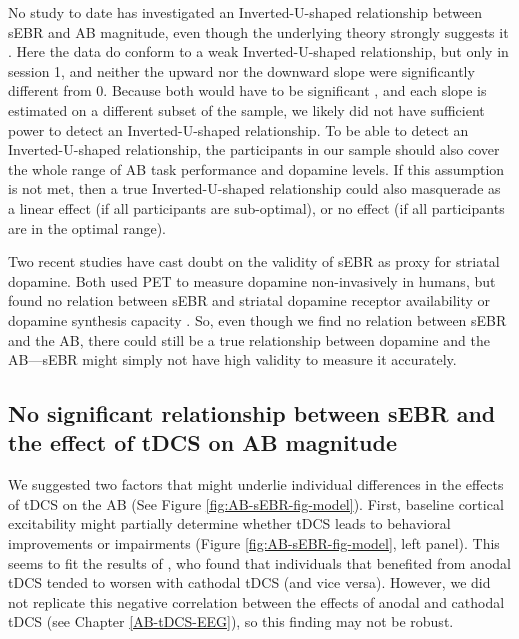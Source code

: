 \documentclass[11pt,]{memoir}
\begin{document}
No study to date has investigated an Inverted-U-shaped relationship between sEBR and AB magnitude, even though the underlying theory strongly suggests it \autocites{Cools2011}{Slagter2012}. Here the data do conform to a weak Inverted-U-shaped relationship, but only in session 1, and neither the upward nor the downward slope were significantly different from 0. Because both would have to be significant \autocite{Simonsohn2018}, and each slope is estimated on a different subset of the sample, we likely did not have sufficient power to detect an Inverted-U-shaped relationship. To be able to detect an Inverted-U-shaped relationship, the participants in our sample should also cover the whole range of AB task performance and dopamine levels. If this assumption is not met, then a true Inverted-U-shaped relationship could also masquerade as a linear effect (if all participants are sub-optimal), or no effect (if all participants are in the optimal range).

Two recent studies have cast doubt on the validity of sEBR as proxy for striatal dopamine. Both used PET to measure dopamine non-invasively in humans, but found no relation between sEBR and striatal dopamine receptor availability \autocite{Dang2017} or dopamine synthesis capacity \autocite{Sescousse2018}. So, even though we find no relation between sEBR and the AB, there could still be a true relationship between dopamine and the AB---sEBR might simply not have high validity to measure it accurately.

\hypertarget{no-significant-relationship-between-sebr-and-the-effect-of-tdcs-on-ab-magnitude}{%
\subsection{No significant relationship between sEBR and the effect of tDCS on AB magnitude}\label{no-significant-relationship-between-sebr-and-the-effect-of-tdcs-on-ab-magnitude}}

We suggested two factors that might underlie individual differences in the effects of tDCS on the AB (See Figure \ref{fig:AB-sEBR-fig-model}). First, baseline cortical excitability might partially determine whether tDCS leads to behavioral improvements or impairments \autocite{Krause2013} (Figure \ref{fig:AB-sEBR-fig-model}, left panel). This seems to fit the results of \textcite{London2015}, who found that individuals that benefited from anodal tDCS tended to worsen with cathodal tDCS (and vice versa). However, we did not replicate this negative correlation between the effects of anodal and cathodal tDCS (see Chapter \ref{AB-tDCS-EEG}), so this finding may not be robust.
\end{document}
